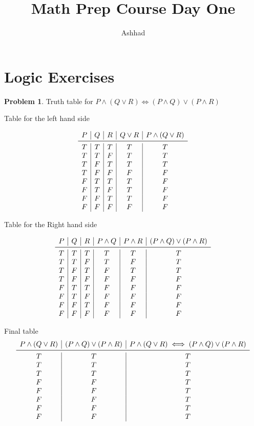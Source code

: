 \documentclass[a4paper]{article}
\title{Math Prep Course Day One}
\author{Ashhad}
\theoremstyle{definition}
\newtheorem{problem}{Problem}[section]
\begin{document}
\maketitle

\section{Logic Exercises}
\begin{problem}
Truth table for \(P \land (Q \lor R) \iff (P \land Q) \lor (P \land R)\)
\end{problem}

Table for the left hand side

\[
\begin{array}{c|c|c|c|c}
P & Q & R & Q \lor R & P \land (Q \lor R) \\
\midrule
T & T & T & T & T \\
T & T & F & T & T \\
T & F & T & T & T \\
T & F & F & F & F \\
F & T & T & T & F \\
F & T & F & T & F \\
F & F & T & T & F \\
F & F & F & F & F \\
\end{array}
\]

Table for the Right hand side

\[
\begin{array}{c|c|c|c|c|c}
P & Q & R & P \land Q & P \land R  & (P \land Q) \lor (P \land R) \\
\midrule
T & T & T & T & T & T \\
T & T & F & T & F & T \\
T & F & T & F & T & T \\
T & F & F & F & F & F \\
F & T & T & F & F & F \\
F & T & F & F & F & F \\
F & F & T & F & F & F \\
F & F & F & F & F & F \\
\end{array}
\]

Final table
\[
\begin{array}{c|c|c}
P \land (Q \lor R) &(P \land Q) \lor (P \land R) & P \land (Q \lor R) \iff (P \land Q) \lor (P \land R)\\
\midrule
T & T & T \\
T & T & T \\
T & T & T \\
F & F & T \\
F & F & T \\
F & F & T \\
F & F & T \\
F & F & T \\
\end{array}
\]
\end{document}
